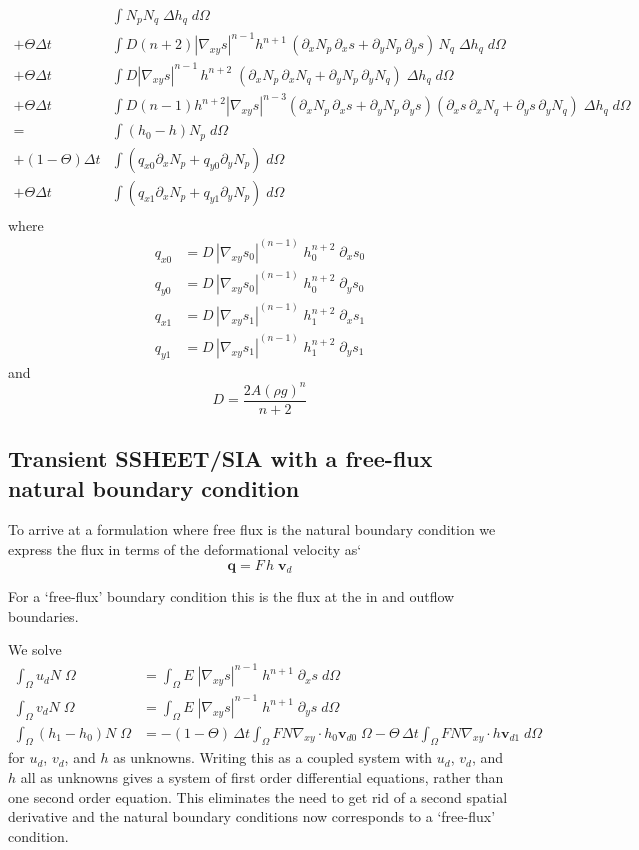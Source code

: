 \documentclass[10pt,a4paper]{book}
\newcommand{\p}{\partial}
\begin{document}
\begin{align*}
&\int N_p N_q \; \Delta h_q \; d \Omega \\
+\Theta \Delta t &\int  D(n+2) |\nabla_{xy} s|^{n-1} h^{n+1} \, (\p_x N_p \, \p_x s  + \p_y N_p \, \p_y s )  \, N_q \;\Delta h_q \; d \Omega \\
+\Theta \Delta t &\int  D|\nabla_{xy}s |^{n-1} \, h^{n+2} \; ( \p_x N_p \, \p_x N_q + \p_y N_p \, \p_y N_q ) \; \Delta h_q \; d \Omega\\
+\Theta \Delta t &\int D(n-1) h^{n+2} |\nabla_{xy} s|^{n-3} ( \p_x N_p \, \p_x s+ \p_y N_p \, \p_y s) ( \p_x s \,\p_x N_q + \p_y s \,\p_y N_q)  \; \Delta h_q \; d \Omega\\
= &\int (h_0-h) N_p \; d \Omega \\
+ (1-\Theta) \Delta t & \int (q_{x0} \p_x N_p + q_{y0} \p_y N_p)\; d \Omega \\
+ \Theta \Delta t & \int (q_{x1} \p_x N_p + q_{y1} \p_y N_p)\; d \Omega \\
\end{align*}
where
\begin{align*}
q_{x0}&=D\,  |\nabla_{xy} s_0|^{(n-1)} \; h_0^{n+2} \; \p_x s_0\\
q_{y0}&=D\,  |\nabla_{xy} s_0|^{(n-1)} \; h_0^{n+2} \; \p_y s_0\\
q_{x1}&=D\,  |\nabla_{xy} s_1|^{(n-1)} \; h_1^{n+2} \; \p_x s_1\\
q_{y1}&=D\,  |\nabla_{xy} s_1|^{(n-1)} \; h_1^{n+2} \; \p_y s_1
\end{align*}
and
\[
D=\frac{2 A (\rho g)^n}{n+2}
\]


\subsection{Transient SSHEET/SIA with a free-flux natural boundary condition}

To arrive at a formulation where free flux is the natural boundary condition we express
the flux in terms of the deformational velocity as`
\[
\bm{q}=F \,h \; \bm{v}_d 
\]

For a `free-flux' boundary condition this is the flux at the in and outflow boundaries.

We solve
\begin{align}
\int_{\Omega} u_d N \; \Omega&= \int_{\Omega} E\;  |\nabla_{xy}s |^{n-1} \; h^{n+1} \; \p_x s\; d\Omega\\
\int_{\Omega} v_d N \; \Omega&= \int_{\Omega} E\;  |\nabla_{xy}s |^{n-1} \; h^{n+1} \; \p_y s\; d\Omega\\
\int_{\Omega} (h_1-h_0) N \; \Omega&= -(1-\Theta) \, \Delta t \int_{\Omega} F N \nabla_{xy} \cdot h_0 \bm{v}_{d0} \; \Omega -   \Theta \, \Delta t \int_{\Omega} F N \nabla_{xy} \cdot h \bm{v}_{d1}\; d\Omega
\end{align}
for $u_d$, $v_d$, and $h$ as unknowns.  Writing this as a coupled system with $u_d$, $v_d$, and $h$ all as unknowns
gives a system of first order differential equations, rather than one second order equation. This eliminates the need to
get rid of a second spatial derivative and the natural boundary conditions now corresponds to a `free-flux' condition.
\end{document}
